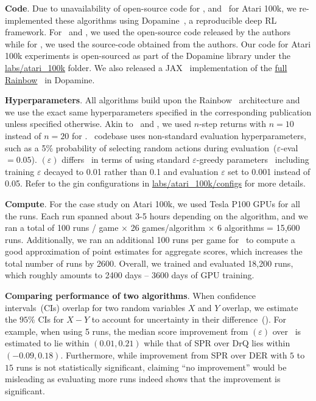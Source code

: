 \textbf{Code}. Due to unavailability of open-source code for \der, and \otr\ for Atari 100k, we re-implemented these algorithms using Dopamine~\citep{castro2018dopamine}, a reproducible deep RL framework. For \curl\ and \spr, we used the open-source code released by the authors while for \drq, we used the source-code obtained from the authors.  Our code for Atari 100k experiments is open-sourced as part of the Dopamine library under the
\href{https://github.com/google/dopamine/tree/master/dopamine/labs/atari_100k}{\ttfamily labs/atari\_100k} folder. We also released a JAX~\citep{jax2018github} implementation of the \href{https://github.com/google/dopamine/blob/master/dopamine/jax/agents/full_rainbow/full_rainbow_agent.py}{full Rainbow}~\citep{hessel2018rainbow} in Dopamine.

\textbf{Hyperparameters}. All algorithms build upon the Rainbow~\citep{hessel2018rainbow} architecture and we use the exact same hyperparameters specified in the corresponding publication unless specified otherwise. Akin to \drq\ and \spr, we used $n$-step returns with $n=10$ instead of $n=20$ for \der. \drq\ codebase uses non-standard evaluation hyperparameters, such as a 5\% probability of selecting random actions during evaluation~({\ttfamily $\varepsilon$-eval}$=0.05$).  \drq$(\varepsilon)$ differs \drq\ in terms of using standard $\varepsilon$-greedy parameters~\citep[][Table 1]{castro2018dopamine} including
training $\varepsilon$ decayed to 0.01 rather than 0.1 and evaluation $\varepsilon$ set to 0.001 instead of 0.05.
Refer to the gin configurations in \href{https://github.com/google/dopamine/tree/master/dopamine/labs/atari_100k/configs}{\ttfamily labs/atari\_100k/configs} for more details.


\textbf{Compute}. For the case study on Atari 100k, we used Tesla P100 GPUs for all the runs. Each run spanned about 3-5 hours depending on the algorithm, and we ran a total of 100 runs / game $\times$ 26 games/algorithm $\times$ 6 algorithms = 15,600 runs. Additionally, we ran an additional 100 runs per game for \der\ to compute a good approximation of point estimates for aggregate scores, which increases the total number of runs by 2600. Overall, we trained and evaluated 18,200 runs, which roughly amounts to 2400 days -- 3600 days of GPU training. 

\textbf{Comparing performance of two algorithms}. When confidence intervals~(CIs) overlap for two random variables $X$ and $Y$ overlap, we estimate the $95\%$ CIs for $X - Y$ to account for uncertainty in their difference~(). For example, when using 5 runs, the median score improvement from \drq$(\varepsilon)$ over \der\ is estimated to lie within $(0.01, 0.21)$ while that of SPR over DrQ lies within $(-0.09, 0.18)$. 
Furthermore, while improvement from SPR over DER with $5$ to $15$ runs is not statistically significant, claiming ``no improvement'' would be misleading as evaluating more runs indeed shows that the improvement is significant.

